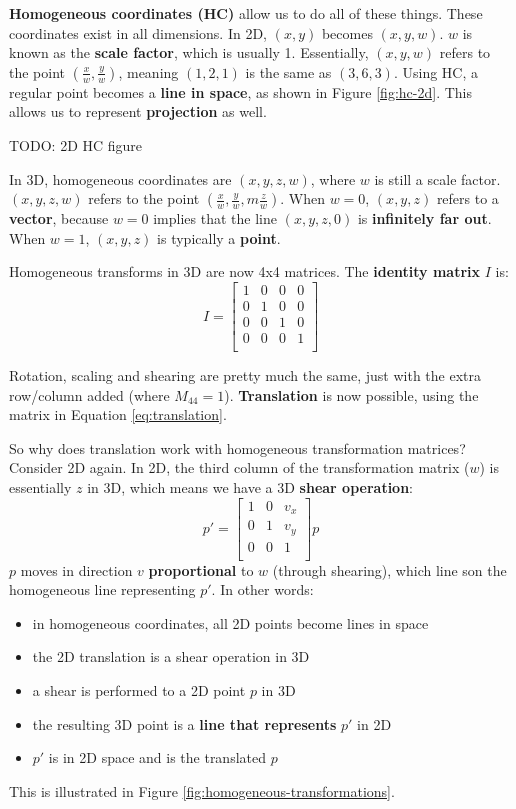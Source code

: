 \documentclass{article}
\begin{document}
\textbf{Homogeneous coordinates (HC)} allow us to do all of these things. These coordinates exist in all dimensions. In 2D, $(x, y)$ becomes $(x, y, w)$. $w$ is known as the \textbf{scale factor}, which is usually 1. Essentially, $(x, y, w)$ refers to the point $(\frac{x}{w}, \frac{y}{w})$, meaning $(1, 2, 1)$ is the same as $(3, 6, 3)$. Using HC, a regular point becomes a \textbf{line in space}, as shown in Figure \ref{fig:hc-2d}. This allows us to represent \textbf{projection} as well.

TODO: 2D HC figure

In 3D, homogeneous coordinates are $(x, y, z, w)$, where $w$ is still a scale factor. $(x, y, z, w)$ refers to the point $(\frac{x}{w}, \frac{y}{w},m \frac{z}{w})$. When $w = 0$, $(x,y,z)$ refers to a \textbf{vector}, because $w = 0$ implies that the line $(x, y, z, 0)$ is \textbf{infinitely far out}. When $w = 1$, $(x, y, z)$ is typically a \textbf{point}.

Homogeneous transforms in 3D are now 4x4 matrices. The \textbf{identity matrix} $I$ is:
\begin{equation}
	I = \left[ \begin{matrix}
	1 & 0 & 0 & 0 \\
	0 & 1 & 0 & 0 \\
	0 & 0 & 1 & 0 \\
	0 & 0 & 0 & 1 \\
	\end{matrix} \right]
\end{equation}

Rotation, scaling and shearing are pretty much the same, just with the extra row/column added (where $M_{44} = 1$). \textbf{Translation} is now possible, using the matrix in Equation \ref{eq:translation}.

So why does translation work with homogeneous transformation matrices? Consider 2D again. In 2D, the third column of the transformation matrix ($w$) is essentially $z$ in 3D, which means we have a 3D \textbf{shear operation}:
\begin{equation}
p' = \left[ \begin{matrix}
	1 & 0 & v_x \\
	0 & 1 & v_y \\	
	0 & 0 & 1 \\
	\end{matrix} \right] p
\end{equation}
$p$ moves in direction $v$ \textbf{proportional} to $w$ (through shearing), which line son the homogeneous line representing $p'$. In other words:
\begin{itemize}
	\item in homogeneous coordinates, all 2D points become lines in space
	\item the 2D translation is a shear operation in 3D
	\item a shear is performed to a 2D point $p$ in 3D
	\item the resulting 3D point is a \textbf{line that represents} $p'$ in 2D
	\item $p'$ is in 2D space and is the translated $p$
\end{itemize}
This is illustrated in Figure \ref{fig:homogeneous-transformations}.
\end{document}
